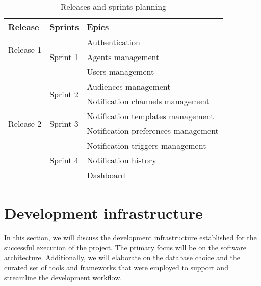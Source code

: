 \begin{table}[hbt!]
      \begin{tabular}{ | m{} | m{} | m{} | }
            \hline
            \textbf{Release}             & \textbf{Sprints}            & \textbf{Epics}                      \\
            \hline
            \multirow{2}{5em}{Release 1}
                                         & \multirow{3}{5em}{Sprint 1} & Authentication                      \\
            \cline{3-3}
                                         &                             & Agents management                   \\
            \cline{3-3}
                                         &                             & Users management                    \\
            \cline{2-3}

                                         & \multirow{2}{5em}{Sprint 2} & Audiences management                \\
            \cline{3-3}
                                         &                             & Notification channels management    \\
            \hline
            \multirow{2}{5em}{Release 2} & \multirow{2}{5em}{Sprint 3} & Notification templates management   \\
            \cline{3-3}
                                         &                             & Notification preferences management \\
            \cline{2-3}
                                         & \multirow{3}{5em}{Sprint 4} & Notification triggers management    \\
            \cline{3-3}
                                         &                             & Notification history                \\
            \cline{3-3}
                                         &                             & Dashboard                           \\
            \hline
      \end{tabular}
      \caption{Releases and sprints planning}
      \label{tab:planning}
\end{table}

\section{Development infrastructure}
In this section, we will discuss the development infrastructure established for the successful execution
of the project. The primary focus will be on the software architecture. Additionally, we will elaborate
on the database choice and the curated set of tools and frameworks that were employed to support and
streamline the development workflow.


